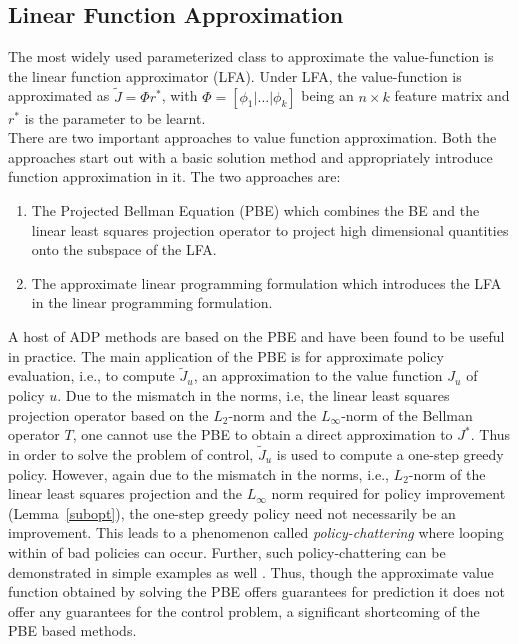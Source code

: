 \subsection{Linear Function Approximation}
The most widely used parameterized class to approximate the value-function is the linear function approximator (LFA). Under LFA, the value-function is approximated as $\tilde{J}=\Phi r^*$, with $\Phi=[\phi_1|\ldots|\phi_k]$ being an $n\times k$ feature matrix and $r^*$ is the parameter to be learnt.\\
There are two important approaches to value function approximation. Both the approaches start out with a basic solution method and appropriately introduce function approximation in it. The two approaches are:
\begin{enumerate}
\item The Projected Bellman Equation (PBE) which combines the BE and the linear least squares projection operator to project high dimensional quantities onto the subspace of the LFA.
\item The approximate linear programming formulation which introduces the LFA in the linear programming formulation. 
\end{enumerate}
A host of ADP methods are based on the PBE and have been found to be useful in practice. The main application of the PBE is for approximate policy evaluation, i.e., to compute $\tilde{J}_u$, an approximation to the value function $J_u$ of policy $u$. Due to the mismatch in the norms, i.e, the linear least squares projection operator based on the $L_2$-norm and the $L_\infty$-norm of the Bellman operator $T$, one cannot use the PBE to obtain a direct approximation to $J^*$. Thus in order to solve the problem of control, $\tilde{J}_u$ is used to compute a one-step greedy policy. However, again due to the mismatch in the norms, i.e., $L_2$-norm of the linear least squares projection and the $L_\infty$ norm required for policy improvement (Lemma~\ref{subopt}), the one-step greedy policy need not necessarily be an improvement. This leads to a phenomenon called \emph{policy-chattering} \cite{dpchapter} where looping within of bad policies can occur. Further, such policy-chattering can be demonstrated in simple examples as well \cite{dpchapter}. Thus, though the approximate value function obtained by solving the PBE offers guarantees for prediction it does not offer any guarantees for the control problem, a significant shortcoming of the PBE based methods.\\
